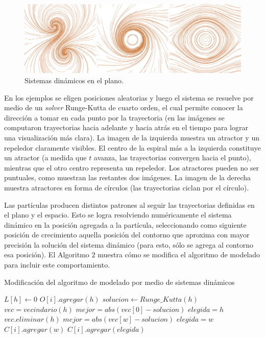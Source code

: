 \begin{figure}[htb!]
  \centerline{\includegraphics[width=13cm]{figures/Fig2}}
  \caption{Sistemas dinámicos en el plano.}
  \label{fg:sistdin2}
\end{figure}

En los ejemplos se eligen posiciones aleatorias y luego el sistema se resuelve por medio de un {\em solver} Runge-Kutta de cuarto orden, el cual permite conocer la direcci\'on a tomar en cada punto por la trayectoria (en las im\'agenes se computaron trayectorias hacia adelante y hacia atrás en el tiempo para lograr una visualizaci\'on más clara).
La imagen de la izquierda muestra un atractor y un repeledor claramente visibles.
El centro de la espiral m\'as a la izquierda constituye un atractor (a medida que $t$ avanza, las trayectorias convergen hacia el punto), mientras que el otro centro representa un repeledor.
Los atractores pueden no ser puntuales, como muestran las restantes dos im\'agenes.
La imagen de la derecha muestra atractores en forma de c\'irculos (las trayectorias ciclan por el c\'irculo).

Las part\'iculas producen distintos patrones al seguir las trayectorias definidas en el plano y el espacio.
Esto se logra resolviendo num\'ericamente el sistema din\'amico en la posici\'on agregada a la part\'icula, seleccionando como siguiente posici\'on de crecimiento aquella posici\'on del contorno que aproxima con mayor precisión la soluci\'on del sistema din\'amico (para esto, sólo se agrega al contorno esa posición).
El Algoritmo $2$ muestra cómo se modifica el algoritmo de modelado para incluir este comportamiento.

\begin{algorithm}[h!]
\caption{Modificación del algoritmo de modelado por medio de sistemas dinámicos}
\begin{algorithmic}
\State $L[h]\gets 0$ 
\State $O[i].agregar(h)$
\State $solucion \gets Runge\_Kutta(h)$
\State $vec = vecindario(h)$
\State $mejor = abs(vec[0] - solucion)$
\State $elegida = h$
\State $vec.eliminar(h)$
        \State $mejor = abs(vec[w]-solucion)$
        \State $elegida = w$
    \EndIf
        \State $C[i].agregar(w)$
    \EndIf
\EndFor
{}
\State $C[i].agregar(elegida)$
\end{algorithmic}
\end{algorithm}

